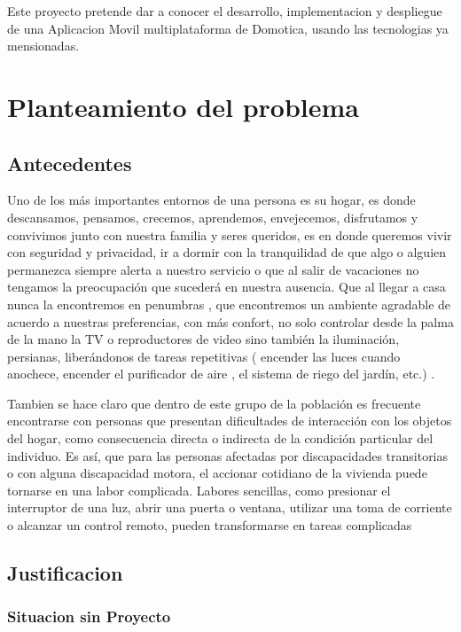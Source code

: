 \documentclass[letterpaper,12pt]{article}
\begin{document}
{		Este proyecto pretende dar a conocer el desarrollo, implementacion  y despliegue de una Aplicacion Movil multiplataforma de Domotica, usando las tecnologias ya mensionadas.
		
		
		\section{Planteamiento del problema}
		\subsection{Antecedentes}
		
		Uno de los más importantes entornos de una persona es su hogar, es donde  descansamos,  pensamos, crecemos, aprendemos,  envejecemos, disfrutamos y convivimos  junto con nuestra familia y seres queridos, es en donde queremos  vivir con seguridad y privacidad, ir  a dormir  con la tranquilidad de que algo o alguien permanezca siempre alerta a nuestro servicio o que al  salir de vacaciones no tengamos la preocupación que sucederá en nuestra ausencia.  Que al llegar a casa  nunca la encontremos en penumbras , que  encontremos un ambiente agradable de acuerdo a nuestras preferencias,  con más confort,    no solo controlar desde la palma de la mano la TV o reproductores de video  sino también  la iluminación, persianas, liberándonos de tareas repetitivas ( encender las luces cuando anochece,  encender el  purificador de aire , el sistema de riego del jardín, etc.) .
		
		Tambien se hace claro que dentro de este grupo de la población es frecuente encontrarse con personas que presentan  dificultades de interacción con los objetos del hogar, como consecuencia directa o indirecta de la condición particular del individuo. Es así, que para las personas afectadas por discapacidades transitorias  o  con alguna discapacidad motora, el accionar cotidiano de la vivienda puede tornarse en una labor complicada. Labores sencillas, como presionar el interruptor de una luz, abrir una puerta o ventana, utilizar una toma de corriente o alcanzar un control remoto, pueden transformarse en tareas complicadas 
		
		
		
		
		\subsection{Justificacion}
		
		\subsubsection{Situacion sin Proyecto}
		
}
\end{document}
